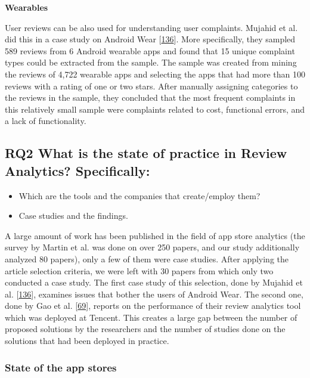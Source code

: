 \documentclass[]{book}
\providecommand{\tightlist}{%
  \setlength{\itemsep}{0pt}\setlength{\parskip}{0pt}}
\begin{document}
\textbf{Wearables}

User reviews can be also used for understanding user complaints. Mujahid
et al. did this in a case study on Android Wear
{[}\protect\hyperlink{ref-mujahid2017examining}{136}{]}. More
specifically, they sampled 589 reviews from 6 Android wearable apps and
found that 15 unique complaint types could be extracted from the sample.
The sample was created from mining the reviews of 4,722 wearable apps
and selecting the apps that had more than 100 reviews with a rating of
one or two stars. After manually assigning categories to the reviews in
the sample, they concluded that the most frequent complaints in this
relatively small sample were complaints related to cost, functional
errors, and a lack of functionality.

\subsection{\texorpdfstring{\textbf{RQ2} What is the state of practice
in Review Analytics?
Specifically:}{RQ2 What is the state of practice in Review Analytics? Specifically:}}\label{rq2-what-is-the-state-of-practice-in-review-analytics-specifically}

\begin{itemize}
\tightlist
\item
  Which are the tools and the companies that create/employ them?
\item
  Case studies and the findings.
\end{itemize}

A large amount of work has been published in the field of app store
analytics (the survey by Martin et al. was done on over 250 papers, and
our study additionally analyzed 80 papers), only a few of them were case
studies. After applying the article selection criteria, we were left
with 30 papers from which only two conducted a case study. The first
case study of this selection, done by Mujahid et al.
{[}\protect\hyperlink{ref-mujahid2017examining}{136}{]}, examines issues
that bother the users of Android Wear. The second one, done by Gao et
al. {[}\protect\hyperlink{ref-gao2018online}{69}{]}, reports on the
performance of their review analytics tool which was deployed at
Tencent. This creates a large gap between the number of proposed
solutions by the researchers and the number of studies done on the
solutions that had been deployed in practice.

\subsubsection{State of the app stores}\label{state-of-the-app-stores}
\end{document}
